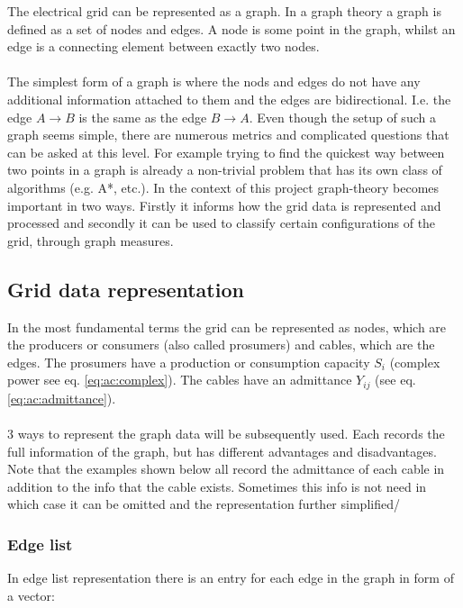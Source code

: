 The electrical grid can be represented as a graph. 
In a graph theory a graph is defined as a set of nodes and edges. A node
is some point in the graph, whilst an edge is a connecting element between exactly
two nodes.\\
\\

The simplest form of a graph is where the nods and edges do not have
any additional information attached to them and the edges are bidirectional.
I.e. the edge $A \to B$ is the same as the edge $B \to A$. Even though the setup
of such a graph seems simple, there are numerous metrics and complicated questions
that can be asked at this level. For example trying to find the quickest way between
two points in a graph is already a non-trivial problem that has its own class of algorithms
(e.g. A*, etc.). In the context of this project graph-theory becomes important in two ways.
Firstly it informs how the grid data is represented and processed and secondly it can
be used to classify certain configurations of the grid, through graph measures.

\subsection{Grid data representation}

In the most fundamental terms the grid can be represented as nodes, which are the 
producers or consumers (also called prosumers) and cables, which are the edges.
The prosumers have a production or consumption capacity $S_i$ (complex power see eq. \ref{eq:ac:complex}).
The cables have an admittance $Y_{ij}$ (see eq. \ref{eq:ac:admittance}).\\
\\
3 ways to represent the graph data will be subsequently used. 
Each records the full information of the graph, but
has different advantages and disadvantages. Note that the examples shown below all record
the admittance of each cable in addition to the info that the cable exists. Sometimes
this info is not need in which case it can be omitted and the representation further simplified/

\subsubsection{Edge list}\label{sec:graph_theory:edge_list}

In edge list representation there is an entry for each edge in the graph in form of a vector:

